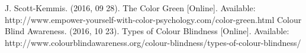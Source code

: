 \documentclass[conference]{IEEEtran}
\begin{document}

%
%
%
\begin{thebibliography}{1}
J. Scott-Kemmis. (2016, 09 28). The Color Green [Online]. Available: http://www.empower-yourself-with-color-psychology.com/color-green.html
Colour Blind Awareness. (2016, 10 23). Types of Colour Blindness [Online]. Available: http://www.colourblindawareness.org/colour-blindness/types-of-colour-blindness/
\end{thebibliography}




\end{document}
